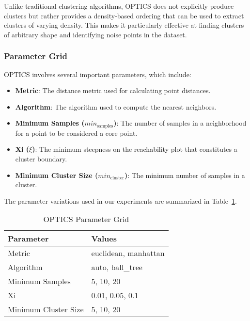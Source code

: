 Unlike traditional clustering algorithms, OPTICS does not explicitly produce clusters but rather provides a density-based ordering that can be used to extract clusters of varying density. This makes it particularly effective at finding clusters of arbitrary shape and identifying noise points in the dataset.

\subsubsection{Parameter Grid}

OPTICS involves several important parameters, which include:

\begin{itemize}
    \item \textbf{Metric}: The distance metric used for calculating point distances.
    \item \textbf{Algorithm}: The algorithm used to compute the nearest neighbors.
    \item \textbf{Minimum Samples (\(min_{\text{samples}}\))}: The number of samples in a neighborhood for a point to be considered a core point.
    \item \textbf{Xi (\(\xi\))}: The minimum steepness on the reachability plot that constitutes a cluster boundary.
    \item \textbf{Minimum Cluster Size (\(min_{\text{cluster}}\))}: The minimum number of samples in a cluster.
\end{itemize}

The parameter variations used in our experiments are summarized in Table~\ref{tab:optics-param-grid}.

\begin{table}[ht]
\centering
\caption{OPTICS Parameter Grid}
\label{tab:optics-param-grid}
\begin{tabularx}{\columnwidth}{|X|X|}
\hline
\textbf{Parameter} & \textbf{Values} \\ \hline
Metric & euclidean, manhattan \\ \hline
Algorithm & auto, ball\_tree \\ \hline
Minimum Samples & 5, 10, 20 \\ \hline
Xi & 0.01, 0.05, 0.1 \\ \hline
Minimum Cluster Size & 5, 10, 20 \\ \hline
\end{tabularx}
\end{table}
